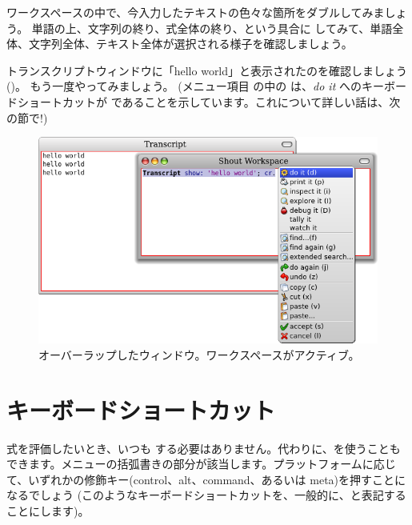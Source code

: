 \documentclass[a4paper,10pt,twoside]{book}
\begin{document}
ワークスペースの中で、今入力したテキストの色々な箇所をダブル\click してみましょう。
単語の上、文字列の終り、式全体の終り、という具合に \click してみて、単語全体、文字列全体、テキスト全体が選択される様子を確認しましょう。

トランスクリプトウィンドウに「hello world」と表示されたのを確認しましょう
()。
もう一度やってみましょう。
(メニュー項目  の中の  は、\emph{do it} へのキーボードショートカットが  であることを示しています。これについて詳しい話は、次の節で!)

\begin{figure}[htb]
\centerline {\includegraphics[width=\textwidth]{HelloWorld}}
\caption{オーバーラップしたウィンドウ。ワークスペースがアクティブ。}
\end{figure}

\section{キーボードショートカット}

式を評価したいとき、いつも \actclick する必要はありません。代わりに、を使うこともできます。メニューの括弧書きの部分が該当します。プラットフォームに応じて、いずれかの修飾キー(control、alt、command、あるいは meta)を押すことになるでしょう
(このようなキーボードショートカットを、一般的に、と表記することにします)。

\end{document}

